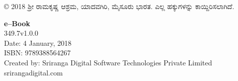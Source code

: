 \thispagestyle{empty}

© 2018 ಶ‍್ರೀ ರಾಮಕೃಷ್ಣ ಆಶ್ರಮ, ಯಾದವಗಿರಿ, ಮೈಸೂರು ಭಾರತ. ಎಲ್ಲ ಹಕ್ಕುಗಳನ್ನು ಕಾಯ್ದಿರಿಸಲಾಗಿದೆ.

 \textbf{e–Book}\\
 349.7v1.0.0\\
 Date: 4 January, 2018\\
 ISBN: 9789388564267\\
 Created by: Sriranga Digital Software Technologies Private Limited\\srirangadigital.com

